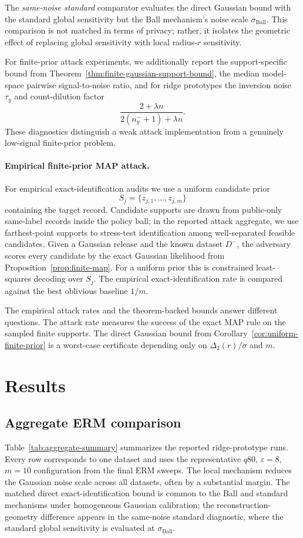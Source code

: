 \documentclass[conference,compsoc]{IEEEtran}
\begin{document}
The \emph{same-noise standard} comparator evaluates the direct Gaussian bound with the standard global sensitivity but the Ball mechanism's noise scale $\sigma_{\mathrm{Ball}}$. This comparison is not matched in terms of privacy; rather, it isolates the geometric effect of replacing global sensitivity with local radius-$r$ sensitivity.

For finite-prior attack experiments, we additionally report the support-specific bound from Theorem~\ref{thm:finite-gaussian-support-bound}, the median model-space pairwise signal-to-noise ratio, and for ridge prototypes the inversion noise $\tau_y$ and count-dilution factor
\[
\frac{2+\lambda n}{2(n_y^-+1)+\lambda n}.
\]
These diagnostics distinguish a weak attack implementation from a genuinely low-signal finite-prior problem.

\paragraph{Empirical finite-prior MAP attack.}
For empirical exact-identification audits we use a uniform candidate prior
\[
S_j=\{z_{j,1},\dots,z_{j,m}\}
\]
containing the target record. Candidate supports are drawn from public-only same-label records inside the policy ball; in the reported attack aggregate, we use farthest-point supports to stress-test identification among well-separated feasible candidates. Given a Gaussian release and the known dataset $D^-$, the adversary scores every candidate by the exact Gaussian likelihood from Proposition~\ref{prop:finite-map}. For a uniform prior this is constrained least-squares decoding over $S_j$. The empirical exact-identification rate is compared against the best oblivious baseline $1/m$.

The empirical attack rates and the theorem-backed bounds answer different questions. The attack rate measures the success of the exact MAP rule on the sampled finite supports. The direct Gaussian bound from Corollary~\ref{cor:uniform-finite-prior} is a worst-case certificate depending only on $\Delta_2(r)/\sigma$ and $m$.

\section{Results}
\label{sec:results}

\subsection{Aggregate ERM comparison}
Table~\ref{tab:aggregate-summary} summarizes the reported ridge-prototype runs. Every row corresponds to one dataset and uses the representative $q80$, $\varepsilon=8$, $m=10$ configuration from the final ERM sweeps. The local mechanism reduces the Gaussian noise scale across all datasets, often by a substantial margin. The matched direct exact-identification bound is common to the Ball and standard mechanisms under homogeneous Gaussian calibration; the reconstruction-geometry difference appears in the same-noise standard diagnostic, where the standard global sensitivity is evaluated at $\sigma_{\mathrm{Ball}}$.
\end{document}
